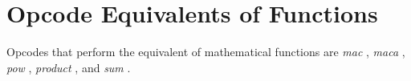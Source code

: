 \begin{comment}
\documentclass[10pt]{article}
\usepackage{fullpage, graphicx, url}
\setlength{\parskip}{1ex}
\setlength{\parindent}{0ex}
\title{Opcode Equivalents of Functions}



\begin{tabular}{ccc}
The Alternative Csound Reference Manual & & \\
Previous &Mathematical Operations &Next

\end{tabular}

\end{comment}
\section{Opcode Equivalents of Functions}


  Opcodes that perform the equivalent of mathematical functions are \emph{mac}
, \emph{maca}
, \emph{pow}
, \emph{product}
, and \emph{sum}
. 


\begin{comment}
\begin{tabular}{lcr}
Previous &Home &Next \\
Mathematical Functions &Up &Random Functions

\end{tabular}



\end{comment}
